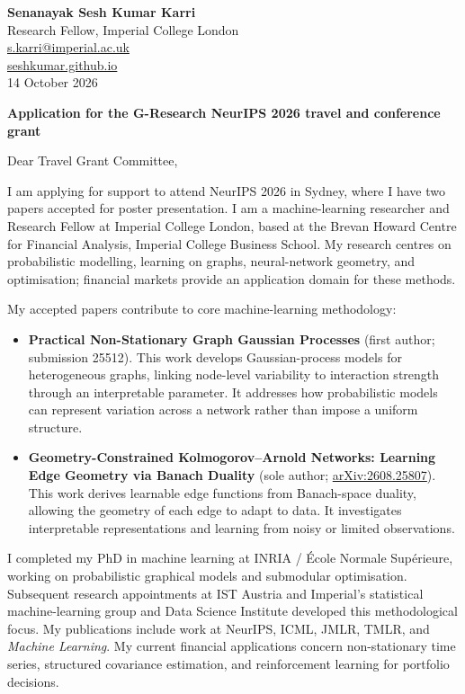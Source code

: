 \documentclass[a4paper,11pt]{article}
\begin{document}
\begin{flushright}
\textbf{Senanayak Sesh Kumar Karri}\\
Research Fellow, Imperial College London\\
\href{mailto:s.karri@imperial.ac.uk}{s.karri@imperial.ac.uk}\\
\href{https://seshkumar.github.io}{seshkumar.github.io}\\
14 October 2026
\end{flushright}
\textbf{Application for the G-Research NeurIPS 2026 travel and conference grant}

Dear Travel Grant Committee,

I am applying for support to attend NeurIPS 2026 in Sydney, where I have two papers accepted for poster presentation. I am a machine-learning researcher and Research Fellow at Imperial College London, based at the Brevan Howard Centre for Financial Analysis, Imperial College Business School. My research centres on probabilistic modelling, learning on graphs, neural-network geometry, and optimisation; financial markets provide an application domain for these methods.

My accepted papers contribute to core machine-learning methodology:
\begin{itemize}[leftmargin=*,itemsep=5pt,topsep=2pt]
\item \textbf{Practical Non-Stationary Graph Gaussian Processes} (first author; submission 25512). This work develops Gaussian-process models for heterogeneous graphs, linking node-level variability to interaction strength through an interpretable parameter. It addresses how probabilistic models can represent variation across a network rather than impose a uniform structure.
\item \textbf{Geometry-Constrained Kolmogorov--Arnold Networks: Learning Edge Geometry via Banach Duality} (sole author; \href{https://arxiv.org/abs/2608.25807}{arXiv:2608.25807}). This work derives learnable edge functions from Banach-space duality, allowing the geometry of each edge to adapt to data. It investigates interpretable representations and learning from noisy or limited observations.
\end{itemize}

I completed my PhD in machine learning at INRIA / \'Ecole Normale Sup\'erieure, working on probabilistic graphical models and submodular optimisation. Subsequent research appointments at IST Austria and Imperial's statistical machine-learning group and Data Science Institute developed this methodological focus. My publications include work at NeurIPS, ICML, JMLR, TMLR, and \textit{Machine Learning}. My current financial applications concern non-stationary time series, structured covariance estimation, and reinforcement learning for portfolio decisions.
\end{document}
